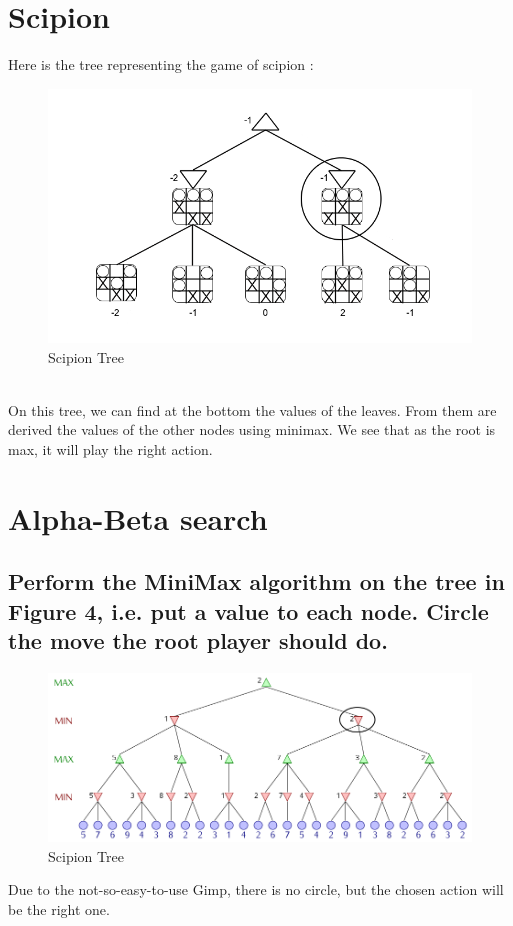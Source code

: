 \documentclass[a4paper,10pt]{article}
\begin{document}
	\newpage
	

	\section{Scipion}
		Here is the tree representing the game of scipion :
		\begin{figure}[h!]
			\centering
				\includegraphics[scale=0.5]{minmax_tree_scipion_specs.png}
			\caption{Scipion Tree}
			\label{fig:server_connection}	
		\end{figure}\\
		On this tree, we can find at the bottom the values of the leaves. From them are derived the values of the other nodes using minimax. We see that as the root is max, it will play the right action.
	\section{Alpha-Beta search}	
		\subsection{Perform the MiniMax algorithm on the tree in Figure 4, i.e. put a value to each node. Circle the move the root player should do.}
		\begin{figure}[h!]
			\centering
				\includegraphics[scale=0.4]{arbre_minimax.png}
			\caption{Scipion Tree}
		\end{figure}
		Due to the not-so-easy-to-use Gimp, there is no circle, but the chosen action will be the right one.
\end{document}
